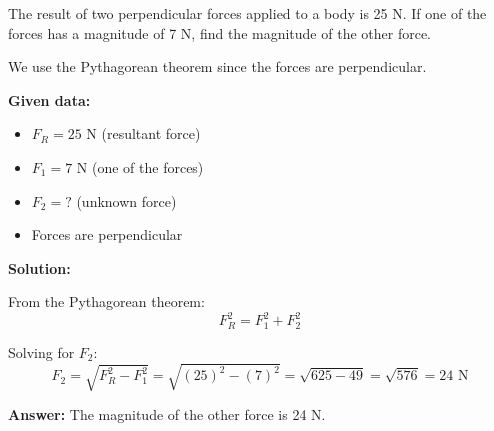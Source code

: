 \begin{exercise}
    The result of two perpendicular forces applied to a body is 25 N.
    If one of the forces has a magnitude of 7 N, find the magnitude of the other force.


    \begin{solu}
        We use the Pythagorean theorem since the forces are perpendicular.

        \textbf{Given data:}
        \begin{itemize}
            \item $F_R = 25$ N (resultant force)
            \item $F_1 = 7$ N (one of the forces)
            \item $F_2 = ?$ (unknown force)
            \item Forces are perpendicular
        \end{itemize}

        \textbf{Solution:}

        From the Pythagorean theorem:
        $$F_R^2 = F_1^2 + F_2^2$$

        Solving for $F_2$:
        $$F_2 = \sqrt{F_R^2 - F_1^2} = \sqrt{(25)^2 - (7)^2} = \sqrt{625 - 49} = \sqrt{576} = 24\text{ N}$$

        \textbf{Answer:} The magnitude of the other force is 24 N.
    \end{solu}
\end{exercise}



